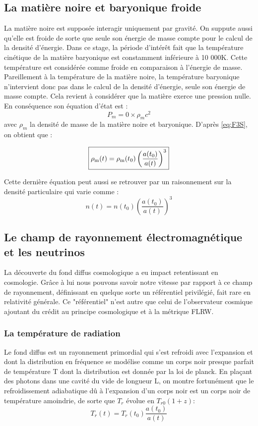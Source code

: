 \documentclass[10pt, a4paper]{report}
\numberwithin{equation}{subsection}
\begin{document}
\subsection{La matière noire et baryonique froide}
La matière noire est supposée interagir uniquement par gravité. On suppute aussi qu'elle est froide de sorte que seule son énergie de masse compte pour le calcul de la densité d'énergie. 
Dans ce stage, la période d'intérêt fait que la température cinétique de la matière baryonique est constamment inférieure à 10 000K. Cette température est considérée comme froide en comparaison à l'énergie de masse. Pareillement à la température de la matière noire, la température baryonique n'intervient donc pas dans le calcul de la densité d'énergie, seule son énergie de masse compte. Cela revient à considérer que la matière exerce une pression nulle.
En conséquence son équation d'état est :
\begin{equation} \label{eq:EEM}
\boxed{P_m=0 \times \rho_m c^2}
\end{equation}
avec $\rho_m$ la densité de masse de la matière noire et baryonique.
D'après \ref{eq:F3S}, on obtient que :

\begin{equation} \label{eq:DEM}
\boxed{\rho_{\rm m}(t) = \rho_{\rm m}(t_0) \left(\frac{a(t_0)}{a(t)}\right)^3}
\end{equation}

Cette dernière équation peut aussi se retrouver par un raisonnement sur la densité particulaire qui varie comme :
\begin{equation} \label{eq:NP}
\boxed{n(t) = n(t_0) \left(\frac{a(t_0)}{a(t)}\right)^3}
\end{equation}

\subsection{Le champ de rayonnement électromagnétique et les neutrinos}
La découverte du fond diffus cosmologique a eu impact retentissant en cosmologie. Grâce à lui nous pouvons savoir notre vitesse par rapport à ce champ de rayonnement, définissant en quelque sorte un référentiel privilégié, fait rare en relativité générale. Ce "référentiel" n'est autre que celui de l'observateur cosmique ajoutant du crédit au principe cosmologique et à la métrique FLRW. 
\subsubsection{La température de radiation}
Le fond diffus est un rayonnement primordial qui s'est refroidi avec l'expansion et dont la distribution en fréquence se modélise comme un corps noir presque parfait de température T dont la distribution est donnée par la loi de planck. En plaçant des photons dans une cavité du vide de longueur L, on montre fortunément que le refroidissement adiabatique dû à l'expansion d'un corps noir est un corps noir de température amoindrie, de sorte que $T_r$ évolue en $T_{r0} (1+z)$:
\begin{equation} \label{eq:TRRA}
\boxed{T_r(t) = T_r(t_0) \frac{a(t_0)}{a(t)}}
\end{equation}
\end{document}
